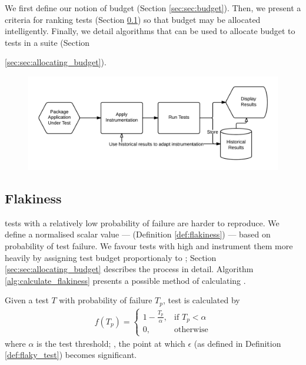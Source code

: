 We first define our notion of budget (Section \ref{sec:sec:budget}). Then, we
present a criteria for ranking \flaky tests (Section \ref{sec:sec:flakiness}) so
that budget may be allocated intelligently. Finally, we detail algorithms that
can be used to allocate budget to tests in a suite (Section
{\ref{sec:sec:allocating_budget}).

\begin{figure}[h]

\includegraphics[width=\linewidth]{Images/architecture_overview}

\caption{}
\label{fig:architecture_overview}
\end{figure}


\subsection{Flakiness}
\label{sec:sec:flakiness}

\flaky tests with a relatively low probability of failure are harder to
reproduce. We define a normalised scalar value --- \emph{\flakiness} (Definition
\ref{def:flakiness}) --- based on probability of test failure. We favour tests
with high \flakiness and instrument them more heavily by assigning \flaky test
budget proportionaly to \flakiness; Section \ref{sec:sec:allocating_budget}
describes the process in detail. Algorithm \ref{alg:calculate_flakiness}
presents a possible method of calculating \flakiness.

\begin{defn}[\Flakiness]
\label{def:flakiness}

Given a test $T$ with probability of failure $T_{p}$, test \flakiness is
calculated by
\begin{align*}
  f(T_{p})=
	\begin{cases}
	    1 - \frac{T_{p}}{\alpha},& \text{if } T_{p}< \alpha\\
	    0,              & \text{otherwise}
	\end{cases}
\end{align*}
where $\alpha$ is the \flaky test threshold; \ie, the point at which $\epsilon$
(as defined in Definition \ref{def:flaky_test}) becomes significant.


\end{defn}}
